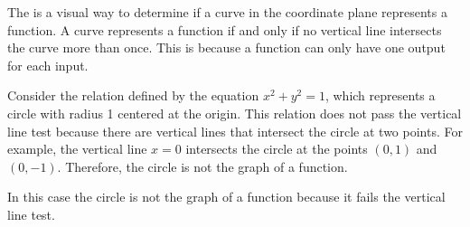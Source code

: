 \documentclass[11pt]{article}
\begin{document}
\begin{center}
\end{center}

\begin{definition}
    The  is a visual way to determine if a curve in the coordinate plane represents a function. A curve represents a function if and only if no vertical line intersects the curve more than once. This is because a function can only have one output for each input.
\end{definition}

\begin{example}
    Consider the relation defined by the equation \( x^2 + y^2 = 1 \), which represents a circle with radius 1 centered at the origin. This relation does not pass the vertical line test because there are vertical lines that intersect the circle at two points. For example, the vertical line \( x = 0 \) intersects the circle at the points \( (0, 1) \) and \( (0, -1) \). Therefore, the circle is not the graph of a function.
\end{example}
\vspace{10pt}
\begin{center}
\end{center}
In this case the circle is not the graph of a function because it fails the vertical line test.\\
\end{document}
